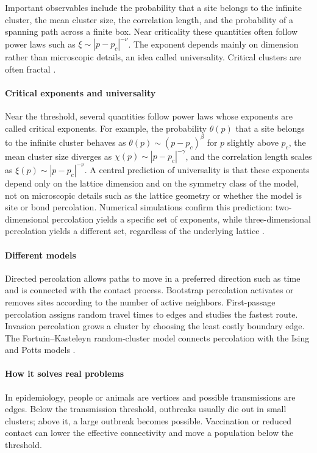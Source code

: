 Important observables include the probability that a site belongs to the infinite cluster, the mean cluster size, the correlation length, and the probability of a spanning path across a finite box. Near criticality these quantities often follow power laws such as $\xi\sim|p-p_c|^{-\nu}$. The exponent depends mainly on dimension rather than microscopic details, an idea called universality. Critical clusters are often fractal \cite{percolation_ref2}.

\paragraph{Critical exponents and universality}
Near the threshold, several quantities follow power laws whose exponents are called critical exponents. For example, the probability $\theta(p)$ that a site belongs to the infinite cluster behaves as $\theta(p)\sim(p-p_c)^{\beta}$ for $p$ slightly above $p_c$, the mean cluster size diverges as $\chi(p)\sim|p-p_c|^{-\gamma}$, and the correlation length scales as $\xi(p)\sim|p-p_c|^{-\nu}$. A central prediction of universality is that these exponents depend only on the lattice dimension and on the symmetry class of the model, not on microscopic details such as the lattice geometry or whether the model is site or bond percolation. Numerical simulations confirm this prediction: two-dimensional percolation yields a specific set of exponents, while three-dimensional percolation yields a different set, regardless of the underlying lattice \cite{percolation_ref2}.

\paragraph{Different models}
Directed percolation allows paths to move in a preferred direction such as time and is connected with the contact process. Bootstrap percolation activates or removes sites according to the number of active neighbors. First-passage percolation assigns random travel times to edges and studies the fastest route. Invasion percolation grows a cluster by choosing the least costly boundary edge. The Fortuin--Kasteleyn random-cluster model connects percolation with the Ising and Potts models \cite{percolation_ref3}.

\paragraph{How it solves real problems}
In epidemiology, people or animals are vertices and possible transmissions are edges. Below the transmission threshold, outbreaks usually die out in small clusters; above it, a large outbreak becomes possible. Vaccination or reduced contact can lower the effective connectivity and move a population below the threshold.


